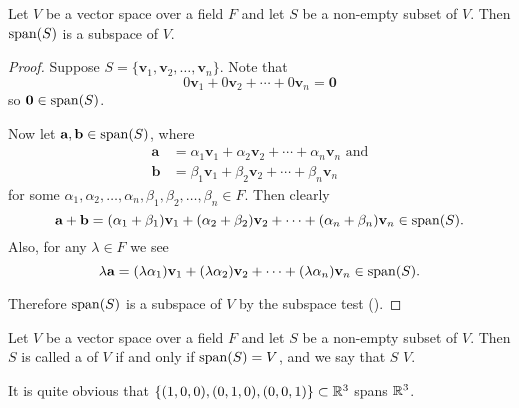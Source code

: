 \begin{proposition}
    Let $V$ be a vector space over a field $F$ and let $S$ be a non-empty subset of $V$. Then $\mathrm{span}(S)$ is a subspace of $V$.
\end{proposition}
\begin{proof}
    Suppose $S = \{\textbf{v}_1, \textbf{v}_2, \dots, \textbf{v}_n\}$. Note that
    \[
        0\textbf{v}_1 + 0\textbf{v}_2 + \cdots + 0\textbf{v}_n = \textbf{0}
    \]
    so $\textbf{0} \in \mathrm{span}(S)$.

    Now let $\textbf{a}, \textbf{b} \in \mathrm{span}(S)$, where
    \begin{align*}
        \textbf{a} &= \alpha_1\textbf{v}_1 + \alpha_2\textbf{v}_2 + \cdots + \alpha_n\textbf{v}_n \text{ and}\\
        \textbf{b} &= \beta_1\textbf{v}_1 + \beta_2\textbf{v}_2 + \cdots + \beta_n\textbf{v}_n
    \end{align*}
    for some $\alpha_1, \alpha_2, \dots, \alpha_n, \beta_1, \beta_2, \dots, \beta_n \in F$. Then clearly
    \[
        \textbf{a} + \textbf{b} = (\alpha_1+\beta_1)\textbf{v}_1 + (\alpha_2+\beta_2)\textbf{v}_2 + \cdots + (\alpha_n+\beta_n)\textbf{v}_n \in \mathrm{span}(S).
    \]
    Also, for any $\lambda \in F$ we see
    \[
        \lambda\textbf{a} = (\lambda\alpha_1)\textbf{v}_1 + (\lambda\alpha_2)\textbf{v}_2 + \cdots + (\lambda\alpha_n)\textbf{v}_n \in \mathrm{span}(S).
    \]

    Therefore $\mathrm{span}(S)$ is a subspace of $V$ by the subspace test ().
\end{proof}

\begin{definition}
    Let $V$ be a vector space over a field $F$ and let $S$ be a non-empty subset of $V$. Then $S$ is called a  of $V$ if and only if $\mathrm{span}(S) = V$, and we say that $S$  $V$.
\end{definition}

\begin{example}
    It is quite obvious that $\{(1, 0, 0), (0, 1, 0), (0, 0, 1)\} \subset \mathbb{R}^3$ spans $\mathbb{R}^3$.
\end{example}

